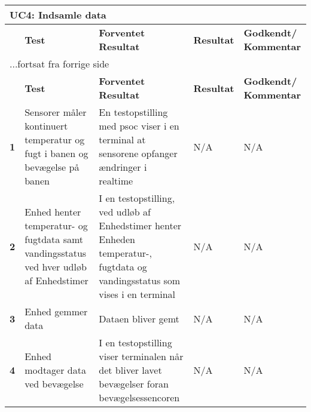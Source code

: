 
\begin{center}
\begin{longtable}{|p{}|p{}|p{}|p{}|p{}|} %
\hline
\multicolumn{5}{|l|}{\textbf{UC4: Indsamle data}} \\ \hline
\multicolumn{1}{|c|}{} &
\textbf{Test} &
\textbf{Forventet \newline Resultat} &
\textbf{Resultat} &
\textbf{Godkendt/ \newline Kommentar} \\ \hline 
\endfirsthead

\multicolumn{5}{l}{...fortsat fra forrige side} \\ \hline 
\multicolumn{1}{|c|}{} &
\textbf{Test} &
\textbf{Forventet \newline Resultat} &
\textbf{Resultat} &
\textbf{Godkendt/ \newline Kommentar} \\ \hline 
\endhead

\textbf{1}	&Sensorer måler kontinuert temperatur og fugt i banen og bevægelse på banen
			&En testopstilling med psoc viser i en terminal at sensorene opfanger ændringer i realtime
			&N/A
			&N/A \\ \hline 
			
\textbf{2}	&Enhed henter temperatur- og fugtdata samt vandingsstatus ved hver udløb af Enhedstimer
			&I en testopstilling, ved udløb af Enhedstimer henter Enheden temperatur-, fugtdata og vandingsstatus som vises i en terminal
			&N/A
			&N/A \\ \hline 
			
\textbf{3}	&Enhed gemmer data
			&Dataen bliver gemt
			&N/A
			&N/A \\ \hline 
			
\textbf{4}	&Enhed modtager data ved bevægelse
			&I en testopstilling viser terminalen når det bliver lavet bevægelser foran bevægelsessencoren
			&N/A
			&N/A \\ \hline 
			
\end{longtable}
	\label{ATUC4} 
\end{center}
